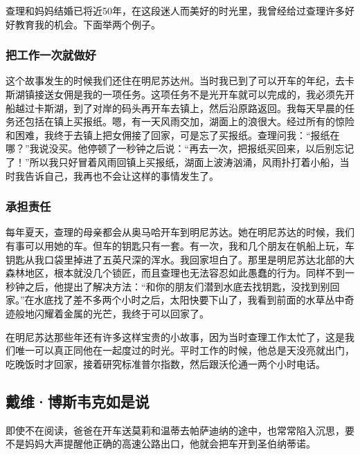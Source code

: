 查理和妈妈结婚已将近50年，在这段迷人而美好的时光里，我曾经给过查理许多好好教育我的机会。下面举两个例子。
\par

\subsubsection*{把工作一次就做好}

这个故事发生的时候我们还住在明尼苏达州。当时我已到了可以开车的年纪，去卡斯湖镇接送女佣是我的一项任务。这项任务不是光开车就可以完成的，我必须先开船越过卡斯湖，到了对岸的码头再开车去镇上，然后沿原路返回。我每天早晨的任务还包括在镇上买报纸。嗯，有一天风雨交加，湖面上的浪很大。经过所有的惊险和困难，我终于去镇上把女佣接了回家，可是忘了买报纸。查理问我：“报纸在哪？”我说没买。他停顿了一秒钟之后说：“再去一次，把报纸买回来，以后别忘记了！”所以我只好冒着风雨回镇上买报纸，湖面上波涛汹涌，风雨扑打着小船，当时我告诉自己，我再也不会让这样的事情发生了。
\par

\subsubsection*{承担责任}

每年夏天，查理的母亲都会从奥马哈开车到明尼苏达。她在明尼苏达的时候，我们有事可以用她的车。但车的钥匙只有一套。有一次，我和几个朋友在帆船上玩，车钥匙从我口袋里掉进了五英尺深的浑水。我回家坦白了。那里是明尼苏达北部的大森林地区，根本就没几个锁匠，而且查理也无法容忍如此愚蠢的行为。同样不到一秒钟之后，他提出了解决方法：“和你的朋友们潜到水底去找钥匙，没找到别回家。”在水底找了差不多两个小时之后，太阳快要下山了，我看到前面的水草丛中奇迹般地闪耀着金属的光芒，我终于可以回家了。
\par

在明尼苏达那些年还有许多这样宝贵的小故事，因为当时查理工作太忙了，这是我们唯一可以真正同他在一起度过的时光。平时工作的时候，他总是天没亮就出门，吃晚饭时才回家，接着研究标准普尔指数，然后跟沃伦通一两个小时电话。
\par

\subsection*{戴维·博斯韦克如是说}

\begin{WisdomBox}
\par

即使不在阅读，爸爸在开车送莫莉和温蒂去帕萨迪纳的途中，也常常陷入沉思，要不是妈妈大声提醒他正确的高速公路出口，他就会把车开到圣伯纳蒂诺。
\par
\end{WisdomBox}


